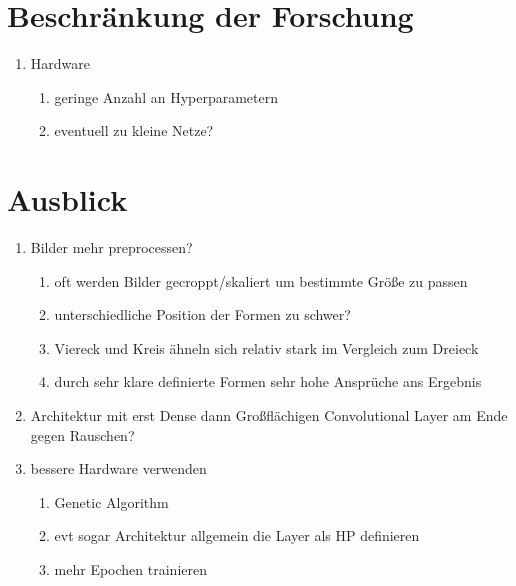 \section{Beschränkung der Forschung}
\begin{enumerate}
	\item Hardware
	\begin{enumerate}
		\item geringe Anzahl an Hyperparametern
		\item eventuell zu kleine Netze?
	\end{enumerate}
\end{enumerate}

\section{Ausblick}
\begin{enumerate}
	\item Bilder mehr preprocessen?
	\begin{enumerate}
		\item oft werden Bilder gecroppt/skaliert um bestimmte Größe zu passen
		\item unterschiedliche Position der Formen zu schwer?
		\item Viereck und Kreis ähneln sich relativ stark im Vergleich zum Dreieck
		\item durch sehr klare definierte Formen sehr hohe Ansprüche ans Ergebnis
	\end{enumerate}

	\item Architektur mit erst Dense dann Großflächigen Convolutional Layer am Ende gegen Rauschen?

	\item bessere Hardware verwenden
	\begin{enumerate}
		\item Genetic Algorithm
		\item evt sogar Architektur allgemein die Layer als HP definieren
		\item mehr Epochen trainieren
	\end{enumerate}
\end{enumerate}